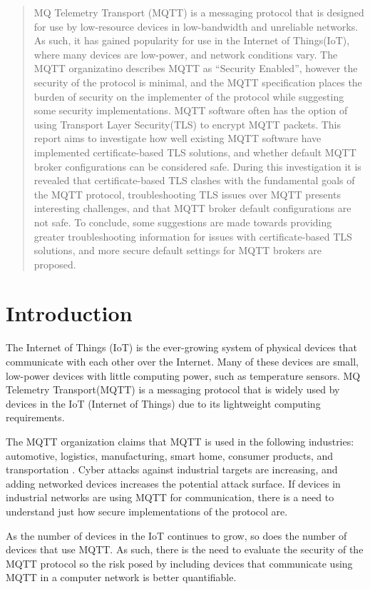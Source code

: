 \documentclass[12pt]{article}
\begin{document}

\begin{abstract}
	MQ Telemetry Transport (MQTT) is a messaging protocol that is designed for use by low-resource devices in low-bandwidth and unreliable networks. As such, it has gained popularity for use in the Internet of Things(IoT), where many devices are low-power, and network conditions vary. The MQTT organizatino describes MQTT as ``Security Enabled''\cite{mqtt-org}, however the security of the protocol is minimal, and the MQTT specification places the burden of security on the implementer of the protocol while suggesting some security implementations\cite{mqtt3.1.1}. MQTT software often has the option of using Transport Layer Security(TLS) to encrypt MQTT packets. This report aims to investigate how well existing MQTT software have implemented certificate-based TLS solutions, and whether default MQTT broker configurations can be considered safe. During this investigation it is revealed that certificate-based TLS clashes with the fundamental goals of the MQTT protocol, troubleshooting TLS issues over MQTT presents interesting challenges, and that MQTT broker default configurations are not safe. To conclude, some suggestions are made towards providing greater troubleshooting information for issues with certificate-based TLS solutions, and more secure default settings for MQTT brokers are proposed.
\end{abstract}\pagebreak
\pagebreak
\tableofcontents\pagebreak
\listoffigures\pagebreak
\listoftables\pagebreak
{}
\section{Introduction}
The Internet of Things (IoT) is the ever-growing system of physical devices that communicate with each other over the Internet.  Many of these devices are small, low-power devices with little computing power, such as temperature sensors. MQ Telemetry Transport(MQTT) is a messaging protocol that is widely used by devices in the IoT (Internet of Things) due to its lightweight computing requirements. \par

The MQTT organization claims that MQTT is used in the following industries: automotive, logistics, manufacturing, smart home, consumer products, and transportation \cite{mqtt-org}. Cyber attacks against industrial targets are increasing, and adding networked devices increases the potential attack surface. If devices in industrial networks are using MQTT for communication, there is a need to understand just how secure implementations of the protocol are.\par
As the number of devices in the IoT continues to grow, so does the number of devices that use MQTT. As such, there is the need to evaluate the security of the MQTT protocol so the risk posed by including devices that communicate using MQTT in a computer network is better quantifiable.
\end{document}

